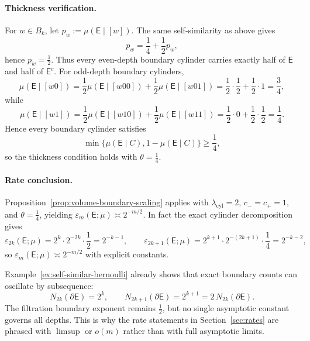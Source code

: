 \begin{example}
\paragraph{Thickness verification.}
For $w\in B_k$, let $p_w:=\mu(\mathsf{E}\mid[w])$.  The same self-similarity
as above gives
\[
p_w=\frac14+\frac12 p_w,
\]
hence $p_w=\frac12$.  Thus every even-depth boundary cylinder carries exactly
half of $\mathsf{E}$ and half of $\mathsf{E}^c$.  For odd-depth boundary
cylinders,
\[
\mu(\mathsf{E}\mid[w0])
=\frac12\mu(\mathsf{E}\mid[w00])+\frac12\mu(\mathsf{E}\mid[w01])
=\frac12\cdot\frac12+\frac12\cdot 1
=\frac34,
\]
while
\[
\mu(\mathsf{E}\mid[w1])
=\frac12\mu(\mathsf{E}\mid[w10])+\frac12\mu(\mathsf{E}\mid[w11])
=\frac12\cdot 0+\frac12\cdot\frac12
=\frac14.
\]
Hence every boundary cylinder satisfies
\[
\min\{\mu(\mathsf{E}\mid C),1-\mu(\mathsf{E}\mid C)\}\ge\frac14,
\]
so the thickness condition holds with $\theta=\frac14$.

\paragraph{Rate conclusion.}
Proposition~\ref{prop:volume-boundary-scaling} applies with
$\lambda_{\mathrm{cyl}}=2$, $c_-=c_+=1$, and $\theta=\frac14$, yielding
$\varepsilon_m(\mathsf{E};\mu)\asymp 2^{-m/2}$.  In fact the exact cylinder
decomposition gives
\[
\varepsilon_{2k}(\mathsf{E};\mu)=2^k\cdot 2^{-2k}\cdot\frac12=2^{-k-1},
\qquad
\varepsilon_{2k+1}(\mathsf{E};\mu)=2^{k+1}\cdot 2^{-(2k+1)}\cdot\frac14=2^{-k-2},
\]
so $\varepsilon_m(\mathsf{E};\mu)\asymp 2^{-m/2}$ with explicit constants.
\end{example}

\begin{remark}
\label{rem:oscillation}
Example~\ref{ex:self-similar-bernoulli} already shows that exact boundary
counts can oscillate by subsequence:
\[
N_{2k}(\partial\mathsf{E})=2^k,
\qquad
N_{2k+1}(\partial\mathsf{E})=2^{k+1}=2\,N_{2k}(\partial\mathsf{E}).
\]
The filtration boundary exponent remains $\frac12$, but no single asymptotic
constant governs all depths.  This is why the rate statements in
Section~\ref{sec:rates} are phrased with $\limsup$ or $o(m)$ rather than with
full asymptotic limits.
\end{remark}

